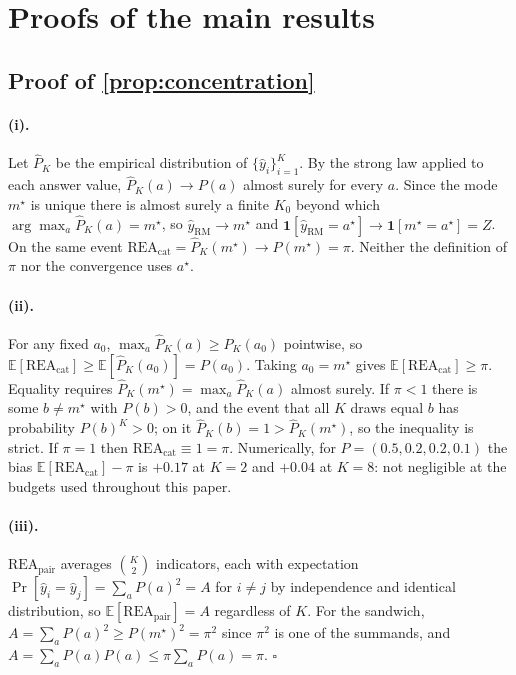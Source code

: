 \documentclass[11pt]{article}
\newcommand{\rea}{\mathrm{REA}}
\newcommand{\rmg}{\mathrm{RM}}
\begin{document}
\section{Proofs of the main results}
\label{app:proof}

\subsection{Proof of \texorpdfstring{\cref{prop:concentration}}{Proposition 1}}

\paragraph{(i).} Let $\hat P_K$ be the empirical distribution of $\{\hat y_i\}_{i=1}^K$. By the strong law applied to each answer value, $\hat P_K(a) \to P(a)$ almost surely for every $a$. Since the mode $m^\star$ is unique there is almost surely a finite $K_0$ beyond which $\arg\max_a \hat P_K(a) = m^\star$, so $\hat y_{\rmg} \to m^\star$ and $\mathbf{1}[\hat y_{\rmg} = a^\star] \to \mathbf{1}[m^\star = a^\star] = Z$. On the same event $\rea_{\text{cat}} = \hat P_K(m^\star) \to P(m^\star) = \pi$. Neither the definition of $\pi$ nor the convergence uses $a^\star$.

\paragraph{(ii).} For any fixed $a_0$, $\max_a \hat P_K(a) \ge \hat P_K(a_0)$ pointwise, so $\mathbb{E}[\rea_{\text{cat}}] \ge \mathbb{E}[\hat P_K(a_0)] = P(a_0)$. Taking $a_0 = m^\star$ gives $\mathbb{E}[\rea_{\text{cat}}] \ge \pi$. Equality requires $\hat P_K(m^\star) = \max_a \hat P_K(a)$ almost surely. If $\pi < 1$ there is some $b \neq m^\star$ with $P(b) > 0$, and the event that all $K$ draws equal $b$ has probability $P(b)^K > 0$; on it $\hat P_K(b) = 1 > \hat P_K(m^\star)$, so the inequality is strict. If $\pi = 1$ then $\rea_{\text{cat}} \equiv 1 = \pi$. Numerically, for $P=(0.5,0.2,0.2,0.1)$ the bias $\mathbb{E}[\rea_{\text{cat}}]-\pi$ is $+0.17$ at $K{=}2$ and $+0.04$ at $K{=}8$: not negligible at the budgets used throughout this paper.

\paragraph{(iii).} $\rea_{\text{pair}}$ averages $\binom{K}{2}$ indicators, each with expectation $\Pr[\hat y_i = \hat y_j] = \sum_a P(a)^2 = A$ for $i \neq j$ by independence and identical distribution, so $\mathbb{E}[\rea_{\text{pair}}] = A$ regardless of $K$. For the sandwich, $A = \sum_a P(a)^2 \ge P(m^\star)^2 = \pi^2$ since $\pi^2$ is one of the summands, and $A = \sum_a P(a)P(a) \le \pi \sum_a P(a) = \pi$. \hfill$\square$
\end{document}
